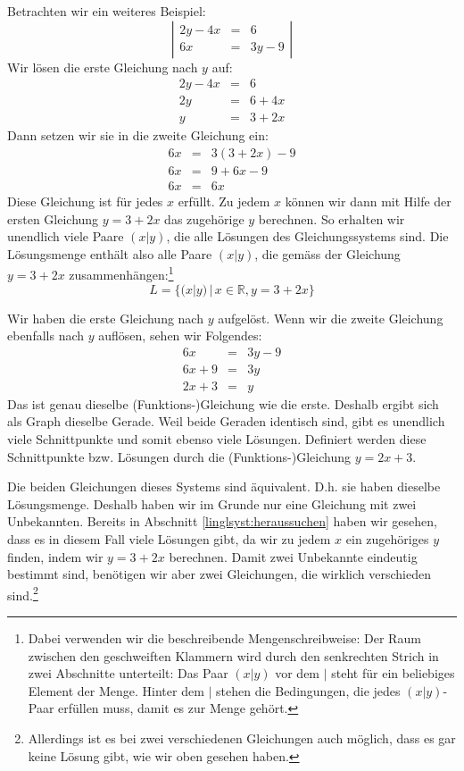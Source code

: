 \documentclass[%
11pt,%
twoside,%
titlepage,%
german,%
]{scrartcl}
\newenvironment{system}{\begin{displaymath}
  \left| 
    \begin{array}{rcl}}{\end{array} \right| 
\end{displaymath}}
\begin{document}
Betrachten wir ein weiteres Beispiel:
\begin{system}
  2y-4x & = & 6 \\
  6x & = & 3y-9
\end{system}Wir l\"osen die erste Gleichung nach $y$ auf:
\begin{eqnarray*}
  2y-4x & = & 6 \\
  2y & = & 6+4x \\
  y & = & 3+2x
\end{eqnarray*}
Dann setzen wir sie in die zweite Gleichung ein:
\begin{eqnarray*}
  6x & = & 3(3+2x)-9 \\
  6x & = & 9+6x-9 \\
  6x & = & 6x
\end{eqnarray*}
Diese Gleichung ist f\"ur jedes $x$ erf\"ullt. Zu jedem $x$ k\"onnen wir dann mit Hilfe der ersten Gleichung $y=3+2x$ das zugeh\"orige $y$ berechnen. So erhalten wir unendlich viele Paare $(x|y)$, die alle L\"osungen des Gleichungssystems sind. Die L\"osungsmenge enth\"alt also alle Paare $(x|y)$, die gem\"ass der Gleichung $y=3+2x$ zusammenh\"angen:\footnote{Dabei verwenden wir die beschreibende Mengenschreibweise: Der Raum zwischen den geschweiften Klammern wird durch den senkrechten Strich in zwei Abschnitte unterteilt: Das Paar $(x|y)$ vor dem $|$ steht f\"ur ein beliebiges Element der Menge. Hinter dem $|$ stehen die Bedingungen, die jedes $(x|y)$-Paar erf\"ullen muss, damit es zur Menge geh\"ort.}
\begin{displaymath}
  L=\{(x|y)\,|\,x\in\mathbb{R}, y=3+2x\}
\end{displaymath}

Wir haben die erste Gleichung nach $y$ aufgel\"ost. Wenn wir die zweite Gleichung ebenfalls nach $y$ aufl\"osen, sehen wir Folgendes:
\begin{eqnarray*}
  6x & = & 3y-9 \\
  6x+9 & = & 3y \\
  2x+3 & = & y
\end{eqnarray*}
Das ist genau dieselbe (Funktions-)Gleichung wie die erste. Deshalb ergibt sich als Graph dieselbe Gerade. Weil beide Geraden identisch sind, gibt es unendlich viele Schnittpunkte und somit ebenso viele L\"osungen. Definiert werden diese Schnittpunkte bzw. L\"osungen durch die (Funktions-)Gleichung $y=2x+3$.

Die beiden Gleichungen dieses Systems sind \"aquivalent. D.h. sie haben dieselbe L\"osungsmenge. Deshalb haben wir im Grunde nur eine Gleichung mit zwei Unbekannten. Bereits in Abschnitt \ref{linglsyst:heraussuchen} haben wir gesehen, dass es in diesem Fall viele L\"osungen gibt, da wir zu jedem $x$ ein zugeh\"origes $y$ finden, indem wir $y=3+2x$ berechnen. Damit zwei Unbekannte eindeutig bestimmt sind, ben\"otigen wir aber zwei Gleichungen, die wirklich verschieden sind.\footnote{Allerdings ist es bei zwei verschiedenen Gleichungen auch m\"oglich, dass es gar keine L\"osung gibt, wie wir oben gesehen haben.}
\end{document}
